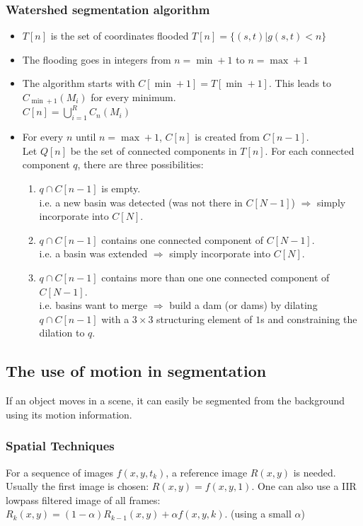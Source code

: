 \subsubsection{Watershed segmentation algorithm}
\begin{itemize}
\item $T[n]$ is the set of coordinates flooded \qquad $T[n] = \{(s,t)|g(s,t)<n\}$
\item The flooding goes in integers from $n=\min+1$ to $n=\max+1$
\item The algorithm starts with $C[\min+1]=T[\min+1]$. This leads to $C_{\min+1}(M_i)$ for every minimum. \\ $C[n]=\bigcup\limits_{i=1}^{R}C_n(M_i)$
\item For every $n$ until $n=\max+1$, $C[n]$ is created from $C[n-1]$. \\
		Let $Q[n]$ be the set of connected components in $T[n]$. For each connected component $q$, there are three possibilities:
	\begin{enumerate}
		\item $q \cap C[n-1]$ is empty. \\ i.e. a new basin was detected (was not there in $C[N-1]$) $\Rightarrow$ simply incorporate into $C[N]$.
		\item $q \cap C[n-1]$ contains one connected component of $C[N-1]$. \\ i.e. a basin was extended $\Rightarrow$ simply incorporate into $C[N]$.
		\item $q \cap C[n-1]$ contains more than one one connected component of $C[N-1]$. \\ i.e. basins want to merge $\Rightarrow$ build a dam (or dams) by dilating $q \cap C[n-1]$ with a $3 \times 3$ structuring element of $1$s and constraining the dilation to $q$.
	\end{enumerate}
\end{itemize}

\subsection{The use of motion in segmentation}
If an object moves in a scene, it can easily be segmented from the background using its motion information.

\subsubsection{Spatial Techniques}
For a sequence of images $f(x,y,t_k)$, a reference image $R(x,y)$ is needed.
Usually the first image is chosen: $R(x,y) = f(x,y,1)$.
One can also use a IIR lowpass filtered image of all frames: $R_k(x,y) = (1-\alpha) R_{k-1}(x,y) + \alpha f(x,y,k)$. (using a small $\alpha$) \\

